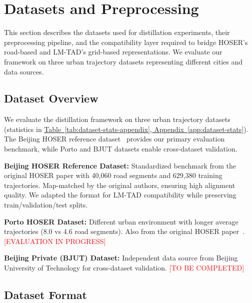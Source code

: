 
\section{Datasets and Preprocessing}
\label{sec:data-preprocessing}

This section describes the datasets used for distillation experiments, their preprocessing pipeline, and the compatibility layer required to bridge HOSER's road-based and LM-TAD's grid-based representations. We evaluate our framework on three urban trajectory datasets representing different cities and data sources.

\subsection{Dataset Overview}
\label{sec:data-overview}

We evaluate the distillation framework on three urban trajectory datasets (statistics in \hyperref[app:dataset-stats]{Table~\ref*{tab:dataset-stats-appendix}, Appendix~\ref*{app:dataset-stats}}). The Beijing HOSER reference dataset~\cite{caoHolisticSemanticRepresentation2025} provides our primary evaluation benchmark, while Porto and BJUT datasets enable cross-dataset validation.

\textbf{Beijing HOSER Reference Dataset:} Standardized benchmark from the original HOSER paper with 40,060 road segments and 629,380 training trajectories. Map-matched by the original authors, ensuring high alignment quality. We adapted the format for LM-TAD compatibility while preserving train/validation/test splits.

\textbf{Porto HOSER Dataset:} Different urban environment with longer average trajectories (8.0 vs 4.6 road segments). Also from the original HOSER paper~\cite{caoHolisticSemanticRepresentation2025}. \textcolor{red}{[EVALUATION IN PROGRESS]}

\textbf{Beijing Private (BJUT) Dataset:} Independent data source from Beijing University of Technology for cross-dataset validation. \textcolor{red}{[TO BE COMPLETED]}

\subsection{Dataset Format}
\label{sec:data-format}

